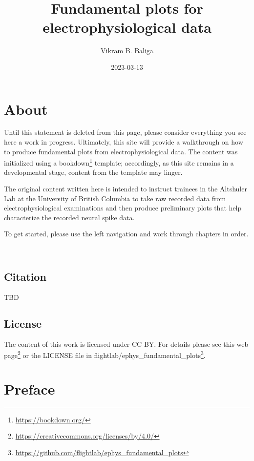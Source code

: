\documentclass[
]{book}
\title{Fundamental plots for electrophysiological data}
\author{Vikram B. Baliga}
\date{2023-03-13}
\DeclareRobustCommand{\href}[2]{#2\footnote{\url{#1}}}
\begin{document}
\maketitle

{
\setcounter{tocdepth}{1}
\tableofcontents
}
\hypertarget{about}{%
\chapter{About}\label{about}}

Until this statement is deleted from this page, please consider everything you
see here a work in progress. Ultimately, this site will provide a walkthrough on
how to produce fundamental plots from electrophysiological data. The content
was initialized using a \href{https://bookdown.org/}{bookdown} template; accordingly,
as this site remains in a developmental stage, content from the template may
linger.

The original content written here is intended to instruct trainees in the
Altshuler Lab at the University of British Columbia to take raw recorded data
from electrophysiological examinations and then produce preliminary plots that
help characterize the recorded neural spike data.

To get started, please use the left navigation and work through chapters in
order.

🐢

\hypertarget{citation}{%
\section*{Citation}\label{citation}}

TBD

\hypertarget{license}{%
\section*{License}\label{license}}

The content of this work is licensed under CC-BY. For details please see
\href{https://creativecommons.org/licenses/by/4.0/}{this web page} or the LICENSE
file in \href{https://github.com/flightlab/ephys_fundamental_plots}{flightlab/ephys\_fundamental\_plots}.

\hypertarget{preface}{%
\chapter{Preface}\label{preface}}
\end{document}
